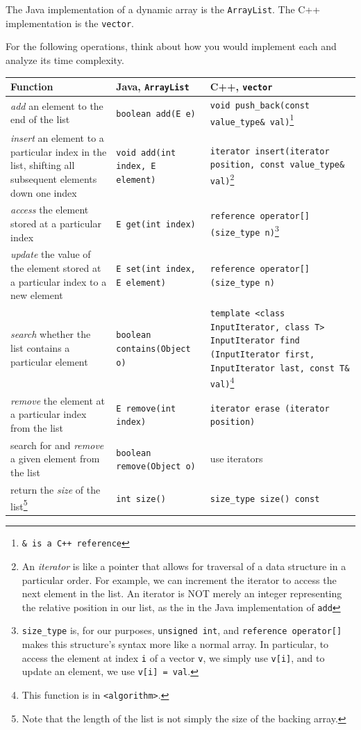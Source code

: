 The Java implementation of a dynamic array is the \texttt{ArrayList}. The C++ implementation is the \texttt{vector}.

For the following operations, think about how you would implement each and analyze its time complexity. 

\begin{center}
    \begin{tabular}{ p{5cm} p{5cm} p{5cm} }
	Function	&	Java, \texttt{ArrayList}	&	C++, \texttt{vector} \\
	\hline
	\textit{add} an element to the end of the list		&	\texttt{boolean add(E e)}	&	\texttt{void push\_back(const value\_type\& val)}\footnote{\texttt{\& is a C++ reference}} \\
	\textit{insert} an element to a particular index in the list, shifting all subsequent elements down one index	&	\texttt{void add(int index, E element)}		&	\texttt{iterator insert(iterator position, const value\_type\& val)}\footnote{An \textit{iterator} is like a pointer that allows for traversal of a data structure in a particular order. For example, we can increment the iterator to access the next element in the list. An iterator is NOT merely an integer representing the relative position in our list, as the in the Java implementation of \texttt{add}}	\\
	\textit{access} the element stored at a particular index	&	\texttt{E get(int index)}		&	\texttt{reference operator[] (size\_type n)}\footnote{\texttt{size\_type} is, for our purposes, \texttt{unsigned int}, and \texttt{reference operator[]} makes this structure's syntax more like a normal array. In particular, to access the element at index \texttt{i} of a vector \texttt{v}, we simply use \texttt{v[i]}, and to update an element, we use \texttt{v[i] = val}.}	\\
	\textit{update} the value of the element stored at a particular index to a new element & \texttt{E set(int index, E element)} & \texttt{reference operator[] (size\_type n)} \\
	\textit{search} whether the list contains a particular element & \texttt{boolean contains(Object o)} & \texttt{template <class InputIterator, class T>
   InputIterator find (InputIterator first, InputIterator last, const T\& val)}\footnote{This function is in \texttt{<algorithm>}.} \\
	\textit{remove} the element at a particular index from the list & \texttt{E remove(int index)} & \texttt{iterator erase (iterator position)} \\
	search for and \textit{remove} a given element from the list & \texttt{boolean remove(Object o)} & use iterators \\
	return the \textit{size} of the list\footnote{Note that the length of the list is not simply the size of the backing array.} & \texttt{int size()} & \texttt{size\_type size() const}
    \end{tabular}
\end{center}

